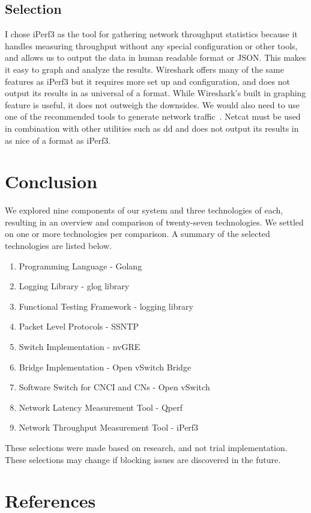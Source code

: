 \documentclass[10pt,letterpaper,onecolumn,journal]{IEEEtran}
\begin{document}
\subsection{Selection}
I chose iPerf3 as the tool for gathering network throughput statistics because it handles measuring throughput without any special configuration or other tools, and allows us to output the data in human readable format or JSON.
This makes it easy to graph and analyze the results.
Wireshark offers many of the same features as iPerf3 but it requires more set up and configuration, and does not output its results in as universal of a format. 
While Wireshark's built in graphing feature is useful, it does not outweigh the downsides.
We would also need to use one of the recommended tools to generate network traffic~\cite{wireshark-tools}.
Netcat must be used in combination with other utilities such as dd and does not output its results in as nice of a format as iPerf3.

\section{Conclusion}
We explored nine components of our system and three technologies of each,
resulting in an overview and comparison of twenty-seven technologies. We settled
on one or more technologies per comparison. A summary of the selected
technologies are listed below.

\begin{enumerate}
	\item Programming Language - Golang
	\item Logging Library - glog library
	\item Functional Testing Framework - logging library
	\item Packet Level Protocols - SSNTP
	\item Switch Implementation - nvGRE
	\item Bridge Implementation - Open vSwitch Bridge
	\item Software Switch for CNCI and CNs - Open vSwitch
	\item Network Latency Measurement Tool - Qperf
	\item Network Throughput Measurement Tool - iPerf3
\end{enumerate}

These selections were made based on research, and not trial implementation.
These selections may change if blocking issues are discovered in the future.
\section{References}



\end{document}
